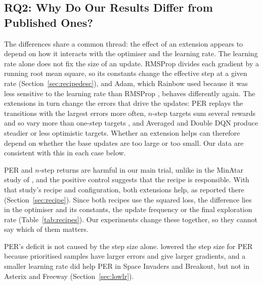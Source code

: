 \documentclass[conference,a4paper]{IEEEtran}
\begin{document}
\subsection{RQ2: Why Do Our Results Differ from Published Ones?}\label{sec:why}
The differences share a common thread: the effect of an extension appears to depend on how it interacts with the
optimiser and the learning rate. The learning rate alone does not fix the size of an update. RMSProp divides each
gradient by a running root mean square, so its constants change the effective step at a given rate
(Section~\ref{sec:recipedesc}), and Adam, which Rainbow used because it was less sensitive to the learning rate than
RMSProp \citep{hessel2018rainbow}, behaves differently again. The extensions in turn change the errors that drive the
updates: PER replays the transitions with the largest errors more often, $n$-step targets sum several rewards and so
vary more than one-step targets \citep{sutton2018reinforcement}, and Averaged and Double DQN produce steadier or less
optimistic targets. Whether an extension helps can therefore depend on whether the base updates are too large or too
small. Our data are consistent with this in each case below.

PER and $n$-step returns are harmful in our main trial, unlike in the MinAtar study of
\citet{obandoceron2021revisiting}, and the positive control suggests that the recipe is responsible. With that
study's recipe and configuration, both extensions help, as reported there (Section~\ref{sec:recipe}). Since both
recipes use the squared loss, the difference lies in the optimiser and its constants, the update frequency or the
final exploration rate (Table~\ref{tab:recipes}). Our experiments change these together, so they cannot say which of
them matters.

PER's deficit is not caused by the step size alone. \citet{schaul2016prioritized} lowered the step size for PER because
prioritised samples have larger errors and give larger gradients, and a smaller learning rate did help PER in Space
Invaders and Breakout, but not in Asterix and Freeway (Section~\ref{sec:lowlr}).
\end{document}
